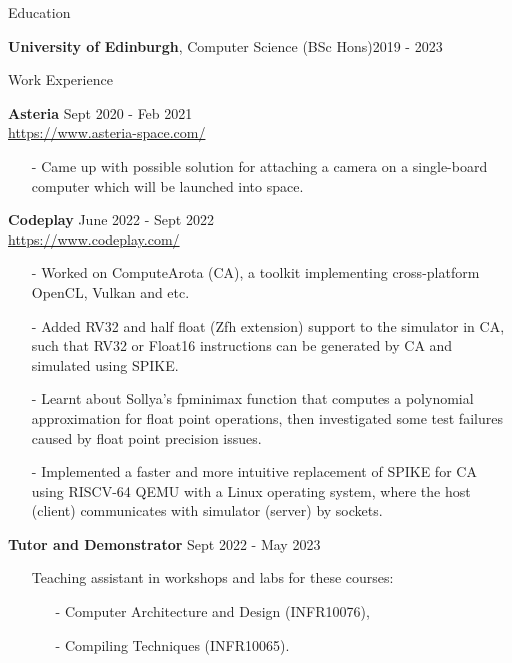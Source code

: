 \documentclass{resume} %
\newcommand{\itemsepval}{-4pt}
\begin{document}
\begin{rSection}{Education}

{\bf  University of Edinburgh}, Computer Science (BSc Hons)\hfill {2019 - 2023}

\end{rSection}


\begin{rSection}{Work Experience}

    \textbf{Asteria} \hfill Sept 2020 - Feb 2021\\
    \url{https://www.asteria-space.com/} \hfill 
    \begin{itemize}
        \itemsep \itemsepval {} 
        \item[-] Came up with possible solution for attaching a camera on a single-board computer which will be launched into space.
    \end{itemize}
     
    \textbf{Codeplay} \hfill June 2022 - Sept 2022 \\
    \url{https://www.codeplay.com/} \hfill 
    \begin{itemize}
        \itemsep \itemsepval {} 
        \item[-] Worked on ComputeArota (CA), a toolkit implementing cross-platform OpenCL, Vulkan and etc.
        \item[-] Added RV32 and half float (Zfh extension) support to the simulator in CA, such that RV32 or Float16 instructions can be generated by CA and simulated using SPIKE. 
        \item[-] Learnt about Sollya’s fpminimax function that computes a polynomial approximation for float point operations, then investigated some test failures caused by float point precision issues.
        \item[-] Implemented a faster and more intuitive replacement of SPIKE for CA using RISCV-64 QEMU with a Linux operating system, where the host (client) communicates with simulator (server) by sockets. 
    \end{itemize}
      
    \textbf{Tutor and Demonstrator} \hfill Sept 2022 - May 2023    
    \begin{itemize}
        \itemsep \itemsepval {} 
        \item[]  Teaching assistant in workshops and labs for these courses: 
        \begin{itemize}
            \itemsep \itemsepval {} 
            \item[-]  Computer Architecture and Design (INFR10076), 
            \item[-]  Compiling Techniques (INFR10065).
        \end{itemize}
    \end{itemize}


    \end{rSection} 
\end{document}
